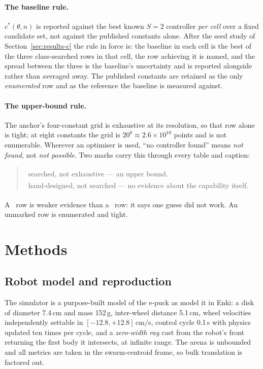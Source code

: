 \documentclass[11pt,a4paper]{article}
\newcommand{\dg}{\textsuperscript{\dag}}
\newcommand{\ddg}{\textsuperscript{\ddag}}
\begin{document}
\paragraph{The baseline rule.} $c^*(\theta, n)$ is reported against the best
known $S = 2$ controller \emph{per cell} over a fixed candidate set, not against
the published constants alone. After the seed study of
Section~\ref{sec:results-c} the rule in force is: the baseline in each cell is
the best of the three class-searched rows in that cell, the row achieving it is
named, and the spread between the three is the baseline's uncertainty and is
reported alongside rather than averaged away. The published constants are
retained as the only \emph{enumerated} row and as the reference the baseline is
measured against.

\paragraph{The upper-bound rule.} The anchor's four-constant grid is exhaustive
at its resolution, so that row alone is tight; at eight constants the grid is
$20^8 \approx 2.6\times10^{10}$ points and is not enumerable. Wherever an optimiser
is used, ``no controller found'' means \emph{not found}, not \emph{not possible}.
Two marks carry this through every table and caption:

\begin{quote}
\dg\ searched, not exhaustive --- an upper bound.\\
\ddg\ hand-designed, not searched --- no evidence about the capability itself.
\end{quote}

\noindent A \ddg\ row is weaker evidence than a \dg\ row: it says one guess did
not work. An unmarked row is enumerated and tight.

\section{Methods}
\label{sec:methods}

\subsection{Robot model and reproduction}

The simulator is a purpose-built model of the e-puck as \citet{gauci2014} model
it in Enki: a disk of diameter 7.4\,cm and mass 152\,g, inter-wheel distance
5.1\,cm, wheel velocities independently settable in $[-12.8, +12.8]$\,cm/s,
control cycle 0.1\,s with physics updated ten times per cycle, and a
\emph{zero-width ray} cast from the robot's front returning the first body it
intersects, at infinite range. The arena is unbounded and all metrics are taken
in the swarm-centroid frame, so bulk translation is factored out.
\end{document}
